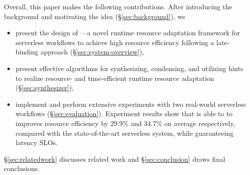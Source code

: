 Overall, this paper makes the following contributions. After introducing the background and motivating the idea (\S\ref{sec:background}), we
\begin{itemize}
    \item  present the design of \namex---a novel runtime resource adaptation framework for serverless workflows to achieve high resource efficiency following a late-binding approach (\S\ref{sec:system-overview}),
    \item present effective algorithms for synthesizing, condensing, and utilizing hints to realize resource- and time-efficient runtime resource adaptation (\S\ref{sec:synthesizer}), 
    \item implement \namex and perform extensive experiments with two real-world serverless workflows (\S\ref{sec:evaluation}). Experiment results show that \namex  is able to to improves resource efficiency by 29.9\% and 34.7\% on average respectively, compared with the state-of-the-art serverless system, while guaranteeing latency SLOs.
\end{itemize}
\S\ref{sec:relatedwork} discusses related work and \S\ref{sec:conclusion} draws final conclusions.  



